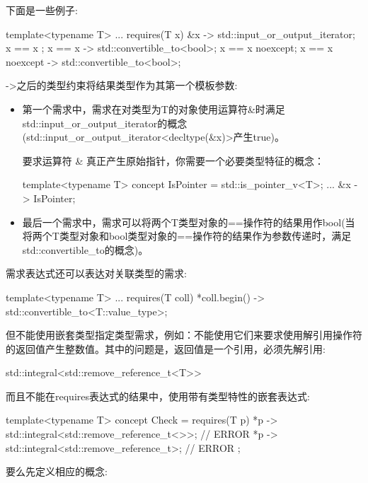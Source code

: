 下面是一些例子:

\begin{cpp}
template<typename T>
... requires(T x) {
	{ &x } -> std::input_or_output_iterator;
	{ x == x };
	{ x == x } -> std::convertible_to<bool>;
	{ x == x }noexcept;
	{ x == x }noexcept -> std::convertible_to<bool>;
}
\end{cpp}

->之后的类型约束将结果类型作为其第一个模板参数:

\begin{itemize}
\item
第一个需求中，需求在对类型为T的对象使用运算符\&时满足std::input\_or\_output\_iterator的概念(std::input\_or\_output\_iterator<decltype(\&x)>产生true)。

要求运算符 \& 真正产生原始指针，你需要一个必要类型特征的概念：

\begin{cpp}
template<typename T> concept IsPointer = std::is_pointer_v<T>;
 ...
   { &x } -> IsPointer;
\end{cpp}

\item
最后一个需求中，需求可以将两个T类型对象的==操作符的结果用作bool(当将两个T类型对象和bool类型对象的==操作符的结果作为参数传递时，满足std::convertible\_to的概念)。
\end{itemize}

需求表达式还可以表达对关联类型的需求:

\begin{cpp}
template<typename T>
... requires(T coll) {
	{ *coll.begin() } -> std::convertible_to<T::value_type>;
}
\end{cpp}

但不能使用嵌套类型指定类型需求，例如：不能使用它们来要求使用解引用操作符的返回值产生整数值。其中的问题是，返回值是一个引用，必须先解引用:

\begin{cpp}
std::integral<std::remove_reference_t<T>>
\end{cpp}

而且不能在requires表达式的结果中，使用带有类型特性的嵌套表达式:

\begin{cpp}
template<typename T>
concept Check = requires(T p) {
	{ *p } -> std::integral<std::remove_reference_t<>>; // ERROR
	{ *p } -> std::integral<std::remove_reference_t>; // ERROR
};
\end{cpp}

要么先定义相应的概念:


